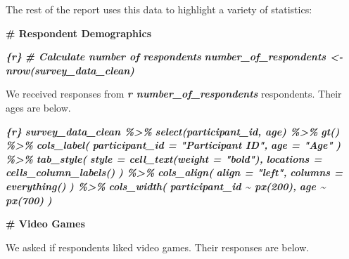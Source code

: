 \documentclass[
]{book}
\newenvironment{Shaded}{\begin{snugshade}}{\end{snugshade}}
\newcommand{\FunctionTok}[1]{\textcolor[rgb]{0.13,0.29,0.53}{\textbf{#1}}}
\newcommand{\InformationTok}[1]{\textcolor[rgb]{0.56,0.35,0.01}{\textbf{\textit{#1}}}}
\newcommand{\NormalTok}[1]{#1}
\begin{document}
The rest of the report uses this data to highlight a variety of statistics:

\begin{Shaded}
\begin{Highlighting}[]
\FunctionTok{\# Respondent Demographics}

\InformationTok{\textasciigrave{}\textasciigrave{}\textasciigrave{}\{r\}}
\InformationTok{\# Calculate number of respondents}
\InformationTok{number\_of\_respondents \textless{}{-} nrow(survey\_data\_clean)}
\InformationTok{\textasciigrave{}\textasciigrave{}\textasciigrave{}}

\NormalTok{We received responses from }\InformationTok{\textasciigrave{}r number\_of\_respondents\textasciigrave{}}\NormalTok{ respondents. Their ages are below.}

\InformationTok{\textasciigrave{}\textasciigrave{}\textasciigrave{}\{r\}}
\InformationTok{survey\_data\_clean \%\textgreater{}\%}
\InformationTok{  select(participant\_id, age) \%\textgreater{}\%}
\InformationTok{  gt() \%\textgreater{}\%}
\InformationTok{  cols\_label(}
\InformationTok{    participant\_id = "Participant ID",}
\InformationTok{    age = "Age"}
\InformationTok{  ) \%\textgreater{}\%}
\InformationTok{  tab\_style(}
\InformationTok{    style = cell\_text(weight = "bold"),}
\InformationTok{    locations = cells\_column\_labels()}
\InformationTok{  ) \%\textgreater{}\%}
\InformationTok{  cols\_align(}
\InformationTok{    align = "left",}
\InformationTok{    columns = everything()}
\InformationTok{  ) \%\textgreater{}\%}
\InformationTok{  cols\_width(}
\InformationTok{    participant\_id \textasciitilde{} px(200),}
\InformationTok{    age \textasciitilde{} px(700)}
\InformationTok{  )}
\InformationTok{\textasciigrave{}\textasciigrave{}\textasciigrave{}}

\FunctionTok{\# Video Games}

\NormalTok{We asked if respondents liked video games. Their responses are below.}


\end{Highlighting}
\end{Shaded}
\end{document}
